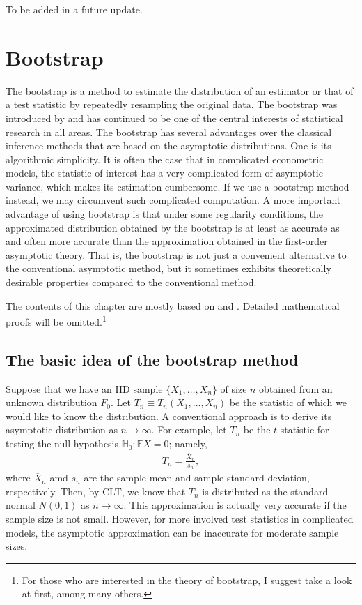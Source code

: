 \documentclass[10.5pt, A4paper, openany, uplatex]{book}
\newcommand{\E}{\mathbb{E}}
\renewcommand{\bar}{\overline}
\numberwithin{equation}{section}
\begin{document}
To be added in a future update.


\chapter{Bootstrap}

The bootstrap is a method to estimate the distribution of an estimator or that of a test statistic by repeatedly resampling the original data.
The bootstrap was introduced by \cite{efron1979bootstrap} and has continued to be one of the central interests of statistical research in all areas.
The bootstrap has several advantages over the classical inference methods that are based on the asymptotic distributions.
One is its algorithmic simplicity.
It is often the case that in complicated econometric models, the statistic of interest has a very complicated form of asymptotic variance, which makes its estimation cumbersome.
If we use a bootstrap method instead, we may circumvent such complicated computation.
A more important  advantage of using bootstrap is that under some regularity conditions, the approximated distribution obtained by the bootstrap is at least as accurate as and often more accurate than the approximation obtained in the first-order asymptotic theory.
That is, the bootstrap is not just a convenient alternative to the conventional asymptotic method, but it sometimes exhibits theoretically desirable properties compared to the conventional method.

The contents of this chapter are mostly based on \cite{HOROWITZ20013159} and \cite{horowitz2019bootstrap}.
Detailed mathematical proofs will be omitted.\footnote{For those who are interested in the theory of bootstrap, I suggest take a look at \cite{hall1992bootstrap} first, among many others.}

\section{The basic idea of the bootstrap method}

Suppose that we have an IID sample $\{X_1, \ldots, X_n\}$ of size $n$ obtained from an unknown distribution $F_0$.
Let $T_n \equiv T_n(X_1, \ldots, X_n)$ be the statistic of which we would like to know the distribution.
A conventional approach is to derive its asymptotic distribution as $n \to \infty$.
For example, let $T_n$ be the $t$-statistic for testing the null hypothesis $\mathbb{H}_0: \E X = 0$; namely,
\begin{align*}
	T_n = \frac{\bar X_n}{s_n},
\end{align*}
where $\bar X_n$ amd $s_n$ are the sample mean and sample standard deviation, respectively.
Then, by CLT, we know that $T_n$ is distributed as the standard normal $N(0,1)$ as $n \to \infty$.
This approximation is actually very accurate if the sample size is not small.
However, for more involved test statistics in complicated models, the asymptotic approximation can be inaccurate for moderate sample sizes.
\end{document}
